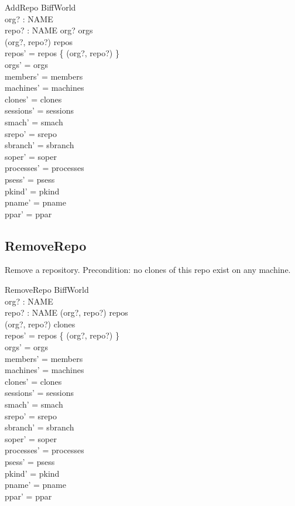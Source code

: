\documentclass[a4paper,10pt,fleqn]{article}
\begin{document}
\begin{schema}{AddRepo}
  \Delta BiffWorld \\
  org? : NAME \\
  repo? : NAME
  \where
  org? \in orgs \\
  (org?, repo?) \notin repos \\
  repos' = repos \cup \{ (org?, repo?) \} \\
  orgs' = orgs \\
  members' = members \\
  machines' = machines \\
  clones' = clones \\
  sessions' = sessions \\
  smach' = smach \\
  srepo' = srepo \\
  sbranch' = sbranch \\
  soper' = soper \\
  processes' = processes \\
  psess' = psess \\
  pkind' = pkind \\
  pname' = pname \\
  ppar' = ppar
\end{schema}

\subsection{RemoveRepo}

Remove a repository.  Precondition: no clones of this repo exist on any
machine.

\begin{schema}{RemoveRepo}
  \Delta BiffWorld \\
  org? : NAME \\
  repo? : NAME
  \where
  (org?, repo?) \in repos \\
  (org?, repo?) \notin \ran clones \\
  repos' = repos \setminus \{ (org?, repo?) \} \\
  orgs' = orgs \\
  members' = members \\
  machines' = machines \\
  clones' = clones \\
  sessions' = sessions \\
  smach' = smach \\
  srepo' = srepo \\
  sbranch' = sbranch \\
  soper' = soper \\
  processes' = processes \\
  psess' = psess \\
  pkind' = pkind \\
  pname' = pname \\
  ppar' = ppar
\end{schema}
\end{document}
